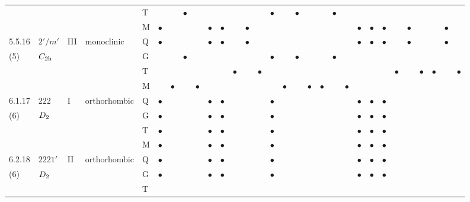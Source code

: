 \documentclass[fleqn,9pt,landscape]{jsarticle}
\begin{document}
\begin{longtable}{lllll|l|lll|ll|lll|l|lll|lll|l|ll|lll|lll}
 &  &  &  & T &  &  & $\bullet$ &  &  &  &  &  &  & $\bullet$ &  & $\bullet$ &  &  & $\bullet$ &  &  &  &  &  &  &  &  &  &  \\
 &  &  &  & M & $\bullet$ &  &  &  & $\bullet$ & $\bullet$ &  & $\bullet$ &  &  &  &  &  &  &  &  & $\bullet$ & $\bullet$ & $\bullet$ &  & $\bullet$ &  &  & $\bullet$ &  \\ \hline
5.5.16 & \texttt{$2'/m'$} & III & monoclinic & Q & $\bullet$ &  &  &  & $\bullet$ & $\bullet$ &  & $\bullet$ &  &  &  &  &  &  &  &  & $\bullet$ & $\bullet$ & $\bullet$ &  & $\bullet$ &  &  & $\bullet$ &  \\
(5) & $C_{\rm 2h}$ &  &  & G &  &  & $\bullet$ &  &  &  &  &  &  & $\bullet$ &  & $\bullet$ &  &  & $\bullet$ &  &  &  &  &  &  &  &  &  &  \\
 &  &  &  & T &  &  &  &  &  &  & $\bullet$ &  & $\bullet$ &  &  &  &  &  &  &  &  &  &  & $\bullet$ &  & $\bullet$ & $\bullet$ &  & $\bullet$ \\
 &  &  &  & M &  & $\bullet$ &  & $\bullet$ &  &  &  &  &  &  & $\bullet$ &  & $\bullet$ & $\bullet$ &  & $\bullet$ &  &  &  &  &  &  &  &  &  \\ \hline
6.1.17 & \texttt{$222$} & I & orthorhombic & Q & $\bullet$ &  &  &  & $\bullet$ & $\bullet$ &  &  &  & $\bullet$ &  &  &  &  &  &  & $\bullet$ & $\bullet$ & $\bullet$ &  &  &  &  &  &  \\
(6) & $D_{\rm 2}$ &  &  & G & $\bullet$ &  &  &  & $\bullet$ & $\bullet$ &  &  &  & $\bullet$ &  &  &  &  &  &  & $\bullet$ & $\bullet$ & $\bullet$ &  &  &  &  &  &  \\
 &  &  &  & T & $\bullet$ &  &  &  & $\bullet$ & $\bullet$ &  &  &  & $\bullet$ &  &  &  &  &  &  & $\bullet$ & $\bullet$ & $\bullet$ &  &  &  &  &  &  \\
 &  &  &  & M & $\bullet$ &  &  &  & $\bullet$ & $\bullet$ &  &  &  & $\bullet$ &  &  &  &  &  &  & $\bullet$ & $\bullet$ & $\bullet$ &  &  &  &  &  &  \\ \hline
6.2.18 & \texttt{$2221'$} & II & orthorhombic & Q & $\bullet$ &  &  &  & $\bullet$ & $\bullet$ &  &  &  & $\bullet$ &  &  &  &  &  &  & $\bullet$ & $\bullet$ & $\bullet$ &  &  &  &  &  &  \\
(6) & $D_{\rm 2}$ &  &  & G & $\bullet$ &  &  &  & $\bullet$ & $\bullet$ &  &  &  & $\bullet$ &  &  &  &  &  &  & $\bullet$ & $\bullet$ & $\bullet$ &  &  &  &  &  &  \\
 &  &  &  & T &  &  &  &  &  &  &  &  &  &  &  &  &  &  &  &  &  &  &  &  &  &  &  &  &  \\

\end{longtable}
\end{document}
